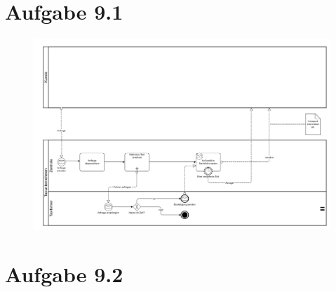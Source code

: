 \documentclass{article}
\begin{document}
	 
	 
	 \section*{Aufgabe 9.1}
	 	\begin{landscape}
	 		\begin{figure}[h!]
	 			\includegraphics[scale=0.14]{aufgabe_9_1.jpg}
	 		\end{figure}
	 	\end{landscape}
	
	
	\section*{Aufgabe 9.2}
\end{document}
